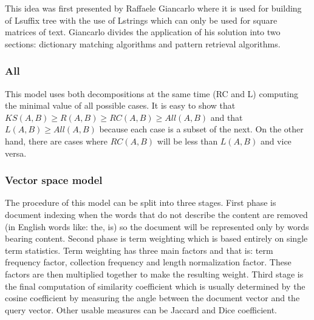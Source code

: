 This idea was first presented by Raffaele Giancarlo \cite{lshape} where it is used for building of Lsuffix tree with the use of Lstrings which can only be used for square matrices of text. Giancarlo divides the application of his solution into two sections: dictionary matching algorithms and pattern retrieval algorithms.

\subsubsection{All}
This model uses both decompositions at the same time (RC and L) computing the minimal value of all possible cases. It
is easy to show that $KS(A,B) \geq R(A,B) \geq RC(A,B) \geq All(A,B)$ and that $L(A,B) \geq All(A,B) $ because each case is a subset of the next. On the other hand, there are cases where $RC(A,B)$ will be less than $L(A,B)$ and vice versa. 


\subsubsection{Vector space model}
The procedure of this model can be split into three stages. First phase is document indexing when the words that do not describe the content are removed (in English words like: the, is) so the document will be represented only by words bearing content. Second phase is term weighting which is based entirely on single term statistics. Term weighting has three main factors and that is: term frequency factor, collection frequency and length normalization factor. These factors are then multiplied together to make the resulting weight. Third stage is the final computation of similarity coefficient which is usually determined by the cosine coefficient by measuring the angle between the document vector and the query vector. Other usable measures can be Jaccard and Dice coefficient.

